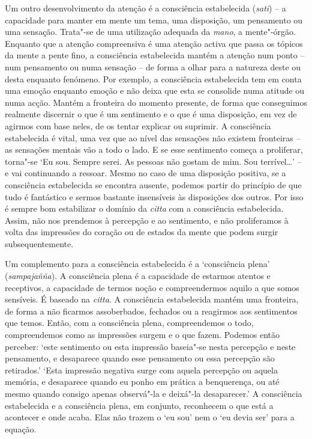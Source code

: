 Um outro desenvolvimento da atenção é a consciência estabelecida (\emph{sati})
-- a capacidade para manter em mente um tema, uma disposição, um pensamento ou
uma sensação. Trata"-se de uma utilização adequada da \emph{mano}, a mente"-órgão.
Enquanto que a atenção compreensiva é uma atenção activa que passa os tópicos da
mente a pente fino, a consciência estabelecida mantém a atenção num ponto -- num
pensamento ou numa sensação -- de forma a olhar para a natureza deste ou desta
enquanto fenómeno. Por exemplo, a consciência estabelecida tem em conta uma
emoção enquanto emoção e não deixa que esta se consolide numa atitude ou numa
acção. Mantém a fronteira do momento presente, de forma que conseguimos
realmente discernir o que é um sentimento e o que é uma disposição, em vez de
agirmos com base neles, de os tentar explicar ou suprimir. A consciência
estabelecida é vital, uma vez que ao nível das sensações não existem fronteiras
-- as sensações mentais vão a todo o lado. E se esse sentimento começa a
proliferar, torna"-se `Eu sou. Sempre serei. As pessoas não gostam de mim. Sou
terrível\ldots{}' -- e vai continuando a ressoar. Mesmo no caso de uma disposição
positiva, se a consciência estabelecida se encontra ausente, podemos partir do
princípio de que tudo é fantástico e sermos bastante insensíveis às disposições
dos outros. Por isso é sempre bom estabilizar o domínio da \emph{citta} com a
consciência estabelecida. Assim, não nos prendemos à percepção e ao sentimento,
e não proliferamos à volta das impressões do coração ou de estados da mente que
podem surgir subsequentemente.

Um complemento para a consciência estabelecida é a `consciência plena'
(\emph{sampajañña}). A consciência plena é a capacidade de estarmos atentos e
receptivos, a capacidade de termos noção e compreendermos aquilo a que somos
sensíveis. É baseado na \emph{citta}. A consciência estabelecida mantém uma
fronteira, de forma a não ficarmos assoberbados, fechados ou a reagirmos aos
sentimentos que temos. Então, com a consciência plena, compreendemos o todo,
compreendemos como as impressões surgem e o que fazem. Podemos então perceber:
`este sentimento ou esta impressão baseia"-se nesta percepção e neste pensamento,
e desaparece quando esse pensamento ou essa percepção são retirados.' `Esta
impressão negativa surge com aquela percepção ou aquela memória, e desaparece
quando eu ponho em prática a benquerença, ou até mesmo quando consigo apenas
observá"-la e deixá"-la desaparecer.' A consciência estabelecida e a consciência
plena, em conjunto, reconhecem o que está a acontecer e onde acaba. Elas não
trazem o `eu sou' nem o `eu devia ser' para a equação.

